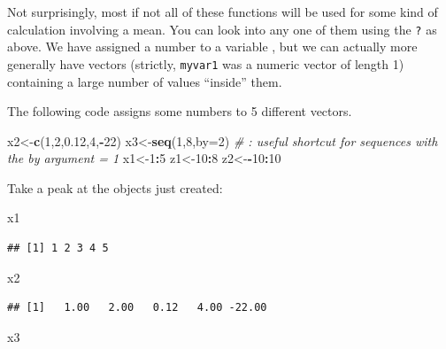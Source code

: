\documentclass[
]{article}
\newenvironment{Shaded}{\begin{snugshade}}{\end{snugshade}}
\newcommand{\AttributeTok}[1]{\textcolor[rgb]{0.13,0.29,0.53}{#1}}
\newcommand{\CommentTok}[1]{\textcolor[rgb]{0.56,0.35,0.01}{\textit{#1}}}
\newcommand{\DecValTok}[1]{\textcolor[rgb]{0.00,0.00,0.81}{#1}}
\newcommand{\FloatTok}[1]{\textcolor[rgb]{0.00,0.00,0.81}{#1}}
\newcommand{\FunctionTok}[1]{\textcolor[rgb]{0.13,0.29,0.53}{\textbf{#1}}}
\newcommand{\NormalTok}[1]{#1}
\newcommand{\OtherTok}[1]{\textcolor[rgb]{0.56,0.35,0.01}{#1}}
\newcommand{\SpecialCharTok}[1]{\textcolor[rgb]{0.81,0.36,0.00}{\textbf{#1}}}
\begin{document}
Not surprisingly, most if not all of these functions will be used for
some kind of calculation involving a mean. You can look into any one of
them using the \texttt{?} as above. We have assigned a number to a
variable , but we can actually more generally have vectors (strictly,
\texttt{myvar1} was a numeric vector of length 1) containing a large
number of values ``inside'' them.

The following code assigns some numbers to 5 different vectors.

\begin{Shaded}
\begin{Highlighting}[]
\NormalTok{x2}\OtherTok{\textless{}{-}}\FunctionTok{c}\NormalTok{(}\DecValTok{1}\NormalTok{,}\DecValTok{2}\NormalTok{,}\FloatTok{0.12}\NormalTok{,}\DecValTok{4}\NormalTok{,}\SpecialCharTok{{-}}\DecValTok{22}\NormalTok{)}
\NormalTok{x3}\OtherTok{\textless{}{-}}\FunctionTok{seq}\NormalTok{(}\DecValTok{1}\NormalTok{,}\DecValTok{8}\NormalTok{,}\AttributeTok{by=}\DecValTok{2}\NormalTok{)}
\CommentTok{\# : useful shortcut for sequences with the by argument = 1}
\NormalTok{x1}\OtherTok{\textless{}{-}}\DecValTok{1}\SpecialCharTok{:}\DecValTok{5}
\NormalTok{z1}\OtherTok{\textless{}{-}}\DecValTok{10}\SpecialCharTok{:}\DecValTok{8}
\NormalTok{z2}\OtherTok{\textless{}{-}}\SpecialCharTok{{-}}\DecValTok{10}\SpecialCharTok{:}\DecValTok{10}
\end{Highlighting}
\end{Shaded}

Take a peak at the objects just created:

\begin{Shaded}
\begin{Highlighting}[]
\NormalTok{x1}
\end{Highlighting}
\end{Shaded}

\begin{verbatim}
## [1] 1 2 3 4 5
\end{verbatim}

\begin{Shaded}
\begin{Highlighting}[]
\NormalTok{x2}
\end{Highlighting}
\end{Shaded}

\begin{verbatim}
## [1]   1.00   2.00   0.12   4.00 -22.00
\end{verbatim}

\begin{Shaded}
\begin{Highlighting}[]
\NormalTok{x3}
\end{Highlighting}
\end{Shaded}
\end{document}
